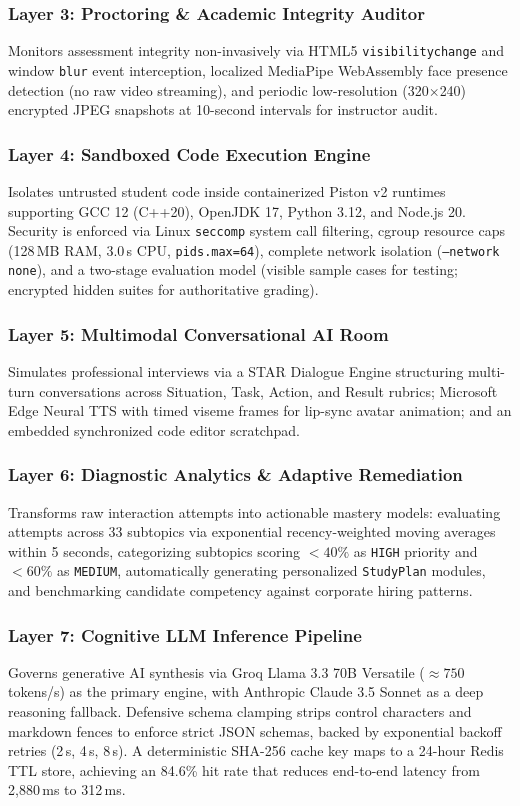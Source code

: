 \documentclass[journal]{IEEEtran}
\begin{document}
\subsubsection{Layer 3: Proctoring \& Academic Integrity Auditor}
Monitors assessment integrity non-invasively via HTML5 \texttt{visibilitychange} and window \texttt{blur} event interception, localized MediaPipe WebAssembly face presence detection (no raw video streaming), and periodic low-resolution (320$\times$240) encrypted JPEG snapshots at 10-second intervals for instructor audit.

\subsubsection{Layer 4: Sandboxed Code Execution Engine}
Isolates untrusted student code inside containerized Piston v2 runtimes supporting GCC 12 (C++20), OpenJDK 17, Python 3.12, and Node.js 20. Security is enforced via Linux \texttt{seccomp} system call filtering, cgroup resource caps (128\,MB RAM, 3.0\,s CPU, \texttt{pids.max=64}), complete network isolation (\texttt{--network none}), and a two-stage evaluation model (visible sample cases for testing; encrypted hidden suites for authoritative grading).

\subsubsection{Layer 5: Multimodal Conversational AI Room}
Simulates professional interviews via a STAR Dialogue Engine structuring multi-turn conversations across Situation, Task, Action, and Result rubrics; Microsoft Edge Neural TTS with timed viseme frames for lip-sync avatar animation; and an embedded synchronized code editor scratchpad.

\subsubsection{Layer 6: Diagnostic Analytics \& Adaptive Remediation}
Transforms raw interaction attempts into actionable mastery models: evaluating attempts across 33 subtopics via exponential recency-weighted moving averages within 5 seconds, categorizing subtopics scoring $<40\%$ as \texttt{HIGH} priority and $<60\%$ as \texttt{MEDIUM}, automatically generating personalized \texttt{StudyPlan} modules, and benchmarking candidate competency against corporate hiring patterns.

\subsubsection{Layer 7: Cognitive LLM Inference Pipeline}
Governs generative AI synthesis via Groq Llama 3.3 70B Versatile ($\approx 750$ tokens/s) as the primary engine, with Anthropic Claude 3.5 Sonnet as a deep reasoning fallback. Defensive schema clamping strips control characters and markdown fences to enforce strict JSON schemas, backed by exponential backoff retries (2\,s, 4\,s, 8\,s). A deterministic SHA-256 cache key maps to a 24-hour Redis TTL store, achieving an 84.6\% hit rate that reduces end-to-end latency from 2,880\,ms to 312\,ms.
\end{document}
